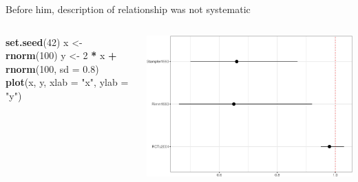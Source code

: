 \documentclass[australian,ignorenonframetext,aspectratio=169]{beamer}
\newenvironment{Shaded}{\begin{snugshade}}{\end{snugshade}}
\newcommand{\DataTypeTok}[1]{\textcolor[rgb]{0.13,0.29,0.53}{#1}}
\newcommand{\DecValTok}[1]{\textcolor[rgb]{0.00,0.00,0.81}{#1}}
\newcommand{\FloatTok}[1]{\textcolor[rgb]{0.00,0.00,0.81}{#1}}
\newcommand{\KeywordTok}[1]{\textcolor[rgb]{0.13,0.29,0.53}{\textbf{#1}}}
\newcommand{\NormalTok}[1]{#1}
\newcommand{\OperatorTok}[1]{\textcolor[rgb]{0.81,0.36,0.00}{\textbf{#1}}}
\newcommand{\StringTok}[1]{\textcolor[rgb]{0.31,0.60,0.02}{#1}}
\begin{document}
\begin{frame}[fragile]{Before him, description of relationship was not
systematic}
\protect\hypertarget{before-him-description-of-relationship-was-not-systematic}{}

\begin{columns}[T]
\begin{column}{0.5\textwidth}
\small

\begin{Shaded}
\begin{Highlighting}[]
\KeywordTok{set.seed}\NormalTok{(}\DecValTok{42}\NormalTok{)}
\NormalTok{x \textless{}{-}}\StringTok{ }\KeywordTok{rnorm}\NormalTok{(}\DecValTok{100}\NormalTok{)}
\NormalTok{y \textless{}{-}}\StringTok{ }\DecValTok{2} \OperatorTok{*}\StringTok{ }\NormalTok{x }\OperatorTok{+}\StringTok{ }\KeywordTok{rnorm}\NormalTok{(}\DecValTok{100}\NormalTok{, }\DataTypeTok{sd =} \FloatTok{0.8}\NormalTok{)}
\KeywordTok{plot}\NormalTok{(x, y, }\DataTypeTok{xlab =} \StringTok{"x"}\NormalTok{, }\DataTypeTok{ylab =} \StringTok{"y"}\NormalTok{)}
\end{Highlighting}
\end{Shaded}
\end{column}

\begin{column}{0.5\textwidth}
\includegraphics{../graphs/unnamed-chunk-3-1.pdf}
\end{column}
\end{columns}

\end{frame}

\end{document}
